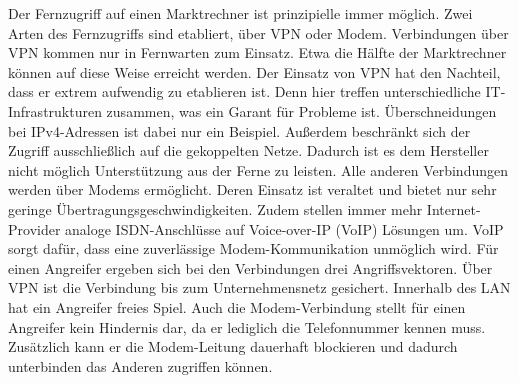 \documentclass[11pt,a4paper]{report}
\begin{document}
Der Fernzugriff auf einen Marktrechner ist prinzipielle immer möglich. Zwei Arten des Fernzugriffs sind etabliert, über VPN oder Modem. Verbindungen über VPN kommen nur in Fernwarten zum Einsatz. Etwa die Hälfte der Marktrechner können auf diese Weise erreicht werden. Der Einsatz von VPN hat den Nachteil, dass er extrem aufwendig zu etablieren ist. Denn hier treffen unterschiedliche IT-Infrastrukturen zusammen, was ein Garant für Probleme ist. Überschneidungen bei IPv4-Adressen ist dabei nur ein Beispiel. Außerdem beschränkt sich der Zugriff ausschließlich auf die gekoppelten Netze. Dadurch ist es dem Hersteller nicht möglich Unterstützung aus der Ferne zu leisten. Alle anderen Verbindungen werden über Modems ermöglicht. Deren Einsatz ist veraltet und bietet nur sehr geringe Übertragungsgeschwindigkeiten. Zudem stellen immer mehr Internet-Provider analoge ISDN-Anschlüsse auf Voice-over-IP (VoIP) Lösungen um. VoIP sorgt dafür, dass eine zuverlässige Modem-Kommunikation unmöglich wird. Für einen Angreifer ergeben sich bei den Verbindungen drei Angriffsvektoren. Über VPN ist die Verbindung bis zum Unternehmensnetz gesichert. Innerhalb des LAN hat ein Angreifer freies Spiel. Auch die Modem-Verbindung stellt für einen Angreifer kein Hindernis dar, da er lediglich die Telefonnummer kennen muss. Zusätzlich kann er die Modem-Leitung dauerhaft blockieren und dadurch unterbinden das Anderen zugriffen können.

\end{document}
